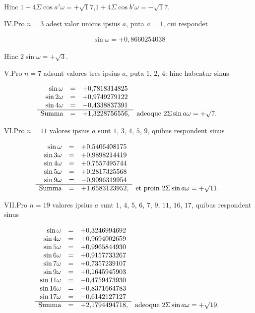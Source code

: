 Hinc $1+4\Sigma\cos a'\omega=+\surd17$,\quad $1+4\Sigma\cos b'\omega=-\surd17$.

%
IV.\quad Pro $n=3$ adest valor unicus ipsius $a$, puta $a=1$, cui respondet

\[
\begin{aligned}
\sin\omega=+0{,}8660254038
\end{aligned}
\]

Hinc $2\sin\omega=+\surd3$.

V.\quad Pro $n=7$ adsunt valores tres ipsius $a$, puta $1$, $2$, $4$: hinc habentur sinus

{\small\setlength{\arraycolsep}{2.5pt}\renewcommand{\arraystretch}{1.15}
\[
\begin{array}{rcll}
\sin\omega&=&+0{,}7818314825&\\
\sin2\omega&=&+0{,}9749279122&\\
\sin4\omega&=&-0{,}4338837391&\\\cline{1-3}
\text{Summa}&=&+1{,}3228756556,&\text{adeoque }2\Sigma\sin a\omega=+\surd7.
\end{array}
\]
}

VI.\quad Pro $n=11$ valores ipsius $a$ sunt $1$, $3$, $4$, $5$, $9$, quibus respondent sinus

{\small\setlength{\arraycolsep}{2.5pt}\renewcommand{\arraystretch}{1.15}
\[
\begin{array}{rcll}
\sin\omega&=&+0{,}5406408175&\\
\sin3\omega&=&+0{,}9898214419&\\
\sin4\omega&=&+0{,}7557495744&\\
\sin5\omega&=&+0{,}2817325568&\\
\sin9\omega&=&-0{,}9096319954&\\\cline{1-3}
\text{Summa}&=&+1{,}6583123952,&\text{et proin }2\Sigma\sin a\omega=+\surd11.
\end{array}
\]
}

VII.\quad Pro $n=19$ valores ipsius $a$ sunt $1$, $4$, $5$, $6$, $7$, $9$, $11$, $16$, $17$, quibus respondent sinus

{\small\setlength{\arraycolsep}{2.5pt}\renewcommand{\arraystretch}{1.15}
\[
\begin{array}{rcll}
\sin\omega&=&+0{,}3246994692&\\
\sin4\omega&=&+0{,}9694002659&\\
\sin5\omega&=&+0{,}9965844930&\\
\sin6\omega&=&+0{,}9157733267&\\
\sin7\omega&=&+0{,}7357239107&\\
\sin9\omega&=&+0{,}1645945903&\\
\sin11\omega&=&-0{,}4759473930&\\
\sin16\omega&=&-0{,}8371664783&\\
\sin17\omega&=&-0{,}6142127127&\\\cline{1-3}
\text{Summa}&=&+2{,}1794494718,&\text{adeoque }2\Sigma\sin a\omega=+\surd19.
\end{array}
\]
}

